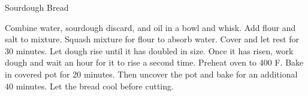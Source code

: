 \documentclass[../main.tex]{subfiles}
\begin{document}
\begin{recipe}{Sourdough Bread}{}{}

    Combine water, sourdough discard, and oil in a bowl and whisk.
    Add flour and salt to mixture. Squash mixture for flour to
    absorb water. Cover and let rest for 30 minutes. Let dough
    rise until it has doubled in size. Once it has risen, work
    dough and wait an hour for it to rise a second time. Preheat
    oven to 400\degrees{} F. Bake in covered pot for 20 minutes.
    Then uncover the pot and bake for an additional 40 minutes.
    Let the bread cool before cutting.
\end{recipe}
\end{document}
